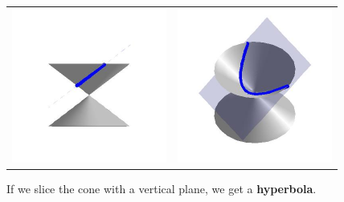 \begin{center}

\begin{tabular}{cc}

\includegraphics[width=2in]{./IntrotoConicsGraphics/Parabola01.jpg} & \includegraphics[width=2in]{./IntrotoConicsGraphics/Parabola02.jpg} \\

\end{tabular}

\end{center}

If we slice the cone with a vertical plane, we get a  \textbf{hyperbola}.

